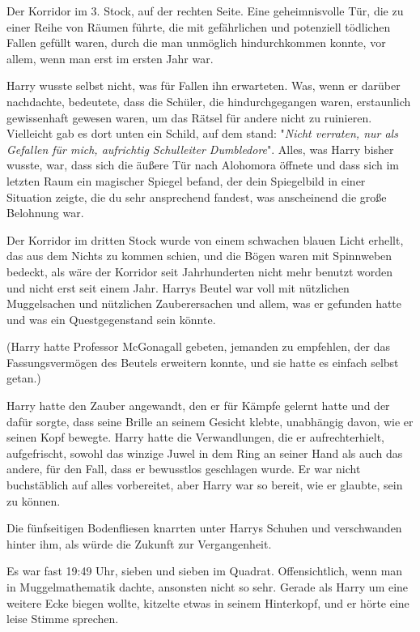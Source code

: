 {Der Korridor im 3. Stock, auf der rechten Seite. Eine geheimnisvolle Tür, die zu einer Reihe von Räumen führte, die mit gefährlichen und potenziell tödlichen Fallen gefüllt waren, durch die man unmöglich hindurchkommen konnte, vor allem, wenn man erst im ersten Jahr war.

Harry wusste selbst nicht, was für Fallen ihn erwarteten. Was, wenn er darüber nachdachte, bedeutete, dass die Schüler, die hindurchgegangen waren, erstaunlich gewissenhaft gewesen waren, um das Rätsel für andere nicht zu ruinieren. Vielleicht gab es dort unten ein Schild, auf dem stand: "\emph{Nicht verraten, nur als Gefallen für mich, aufrichtig Schulleiter Dumbledore}". Alles, was Harry bisher wusste, war, dass sich die äußere Tür nach Alohomora öffnete und dass sich im letzten Raum ein magischer Spiegel befand, der dein Spiegelbild in einer Situation zeigte, die du sehr ansprechend fandest, was anscheinend die große Belohnung war.

Der Korridor im dritten Stock wurde von einem schwachen blauen Licht erhellt, das aus dem Nichts zu kommen schien, und die Bögen waren mit Spinnweben bedeckt, als wäre der Korridor seit Jahrhunderten nicht mehr benutzt worden und nicht erst seit einem Jahr. Harrys Beutel war voll mit nützlichen Muggelsachen und nützlichen Zauberersachen und allem, was er gefunden hatte und was ein Questgegenstand sein könnte.

(Harry hatte Professor McGonagall gebeten, jemanden zu empfehlen, der das Fassungsvermögen des Beutels erweitern konnte, und sie hatte es einfach selbst getan.)

Harry hatte den Zauber angewandt, den er für Kämpfe gelernt hatte und der dafür sorgte, dass seine Brille an seinem Gesicht klebte, unabhängig davon, wie er seinen Kopf bewegte. Harry hatte die Verwandlungen, die er aufrechterhielt, aufgefrischt, sowohl das winzige Juwel in dem Ring an seiner Hand als auch das andere, für den Fall, dass er bewusstlos geschlagen wurde. Er war nicht buchstäblich auf alles vorbereitet, aber Harry war so bereit, wie er glaubte, sein zu können.

Die fünfseitigen Bodenfliesen knarrten unter Harrys Schuhen und verschwanden hinter ihm, als würde die Zukunft zur Vergangenheit.

Es war fast 19:49 Uhr, sieben und sieben im Quadrat. Offensichtlich, wenn man in Muggelmathematik dachte, ansonsten nicht so sehr. Gerade als Harry um eine weitere Ecke biegen wollte, kitzelte etwas in seinem Hinterkopf, und er hörte eine leise Stimme sprechen.

}
